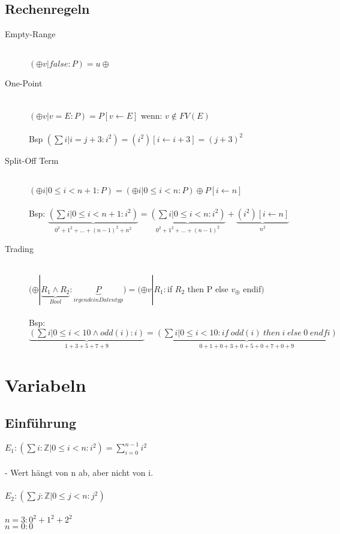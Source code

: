 \documentclass[a4paper,10pt]{article}
\newcommand{\ZN}{\mathbb{Z}} %
\newcommand{\la}{\leftarrow}
\begin{document}
\subsection{Rechenregeln}
\begin{description}
	\item[Empty-Range] \hfill \\
		 $(\oplus v | false : P) = u \oplus$
	\item[One-Point] \hfill \\
		$(\oplus v | v=E : P) = P[v \la E]$ wenn: $v  \notin FV(E)$ \\ \\
		Bsp $(\sum i | i = j + 3 :i^2)=(i^2)[i \la i+3]=(j+3)^2$
	\item [Split-Off Term] \hfill \\
		$(\oplus i | 0 \leq i < n+1:P)=(\oplus i | 0 \leq i < n : P) \oplus P[i \la n]$ \\ \\
		Bsp: $\underbrace{(\sum i | 0 \leq i < n+1:i^2)}_{0^2+1^2+...+(n-1)^2+n^2} = \underbrace{(\sum i | 0 \leq i < n : i^2)}_{0^2+1^2+...+(n-1)^2} + \underbrace{(i^2)[i \la n]}_{n^2}$
	\item[Trading] \hfill \\
		$(\oplus | \underbrace{R_1 \wedge R_2}_{Bool}:\underbrace{P}_{irgendein Datentyp}) = (\oplus v | R_1:$if $R_2$ then P else $v_{\oplus}$ endif$)$ \\ \\
		Bsp: $\underbrace{(\sum i | 0 \leq  i < 10 \wedge odd(i) : i )}_{1+3+5+7+9} = \underbrace{(\sum i | 0 \leq i < 10 :  if \hspace{3pt} odd(i) \hspace{3pt} then \hspace{3pt} i \hspace{3pt} else \hspace{3pt} 0 \hspace{3pt} endfi)}_{0+1+0+3+0+5+0+7+0+9}$
\end{description}

\newpage
\section{Variabeln}

\subsection{Einführung}
$E_1:(\sum i : \ZN | 0 \leq i < n : i^2)=\sum^{n-1}_{i=0} i^2$ \\ \\
- Wert hängt von n ab, aber nicht von i. \\ \\
$E_2:(\sum j :\ZN | 0 \leq j < n : j^2)$ \\ \\
$n=3 :  0^2+1^2+2^2$ \\
$n=0 : 0$
\end{document}
